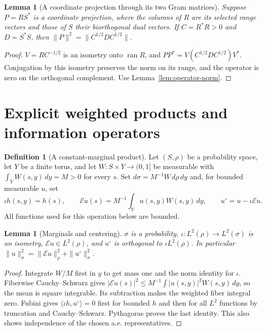 \documentclass[reqno,a4paper,12pt]{amsart}
\newtheorem{lemma}[theorem]{Lemma}
\theoremstyle{definition}
\newtheorem{definition}[theorem]{Definition}
\newcommand{\ip}[2]{\langle #1,#2\rangle}
\newcommand{\ran}{\operatorname{ran}}
\begin{document}
\begin{lemma}[A coordinate projection through its two Gram matrices]
\label{lem:dual-gram}
Suppose $P=RS^*$ is a coordinate projection, where the columns of $R$
are its selected range vectors and those of $S$ their biorthogonal
dual vectors. If $C=R^*R>0$ and $D=S^*S$, then
$\|P\|^2=\|C^{1/2}DC^{1/2}\|$.
\end{lemma}
\begin{proof}
$V=RC^{-1/2}$ is an isometry onto $\ran R$, and
$PP^*=V(C^{1/2}DC^{1/2})V^*$.
Conjugation by this isometry preserves the norm on its range, and the
operator is zero on the orthogonal complement. Use
Lemma~\ref{lem:operator-norm}.
\end{proof}

\section{Explicit weighted products and information operators}
\begin{definition}[A constant-marginal product]\label{def:product}
Let $(S,\rho)$ be a probability space, let $Y$ be a finite torus, and
let $W:S\times Y\to(0,1]$ be measurable with
$\int_YW(s,y)\,dy=M>0$ for every $s$.
Set $d\sigma=M^{-1}W\,d\rho\,dy$ and, for bounded measurable $u$, set
\[
 \iota h(s,y)=h(s),\qquad
 \mathcal Eu(s)=M^{-1}\int_Yu(s,y)W(s,y)\,dy,\qquad
 u^\circ=u-\iota\mathcal Eu.
\]
All functions used for this operation below are bounded.
\end{definition}

\begin{lemma}[Marginals and centering]\label{lem:centering}
$\sigma$ is a probability, $\iota:L^2(\rho)\to L^2(\sigma)$ is an
isometry, $\mathcal Eu\in L^2(\rho)$, and $u^\circ$ is orthogonal to
$\iota L^2(\rho)$. In particular
$\|u\|_\sigma^2=\|\mathcal Eu\|_\rho^2+\|u^\circ\|_\sigma^2$.
\end{lemma}
\begin{proof}
Integrate $W/M$ first in $y$ to get mass one and the norm identity
for $\iota$. Fiberwise Cauchy--Schwarz gives
$|\mathcal Eu(s)|^2\le M^{-1}\int |u(s,y)|^2W(s,y)\,dy$,
so the mean is square integrable. Its subtraction makes the weighted
fiber integral zero. Fubini gives
$\ip{\iota h}{u^\circ}=0$ first for bounded $h$ and then for all $L^2$
functions by truncation and Cauchy--Schwarz. Pythagoras proves the last
identity. This also shows independence of the chosen a.e. representatives.
\end{proof}
\end{document}
